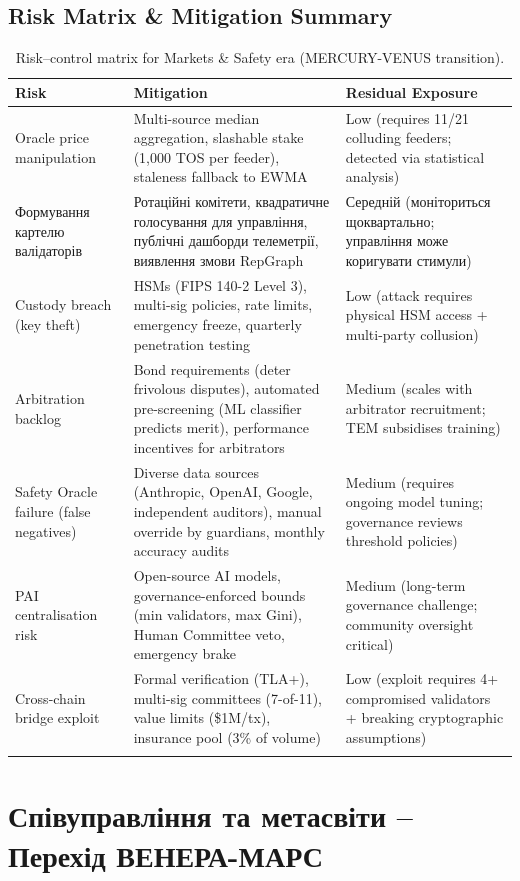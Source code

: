 \documentclass[11pt]{article}
\begin{document}
\subsection{Risk Matrix \& Mitigation Summary}
\begin{longtable}{@{}p{}p{}p{}@{}}
\toprule
\textbf{Risk} & \textbf{Mitigation} & \textbf{Residual Exposure} \\\midrule
Oracle price manipulation & Multi-source median aggregation, slashable stake (1,000 TOS per feeder), staleness fallback to EWMA & Low (requires 11/21 colluding feeders; detected via statistical analysis) \\
Формування картелю валідаторів & Ротаційні комітети, квадратичне голосування для управління, публічні дашборди телеметрії, виявлення змови RepGraph & Середній (моніториться щоквартально; управління може коригувати стимули) \\
Custody breach (key theft) & HSMs (FIPS 140-2 Level 3), multi-sig policies, rate limits, emergency freeze, quarterly penetration testing & Low (attack requires physical HSM access + multi-party collusion) \\
Arbitration backlog & Bond requirements (deter frivolous disputes), automated pre-screening (ML classifier predicts merit), performance incentives for arbitrators & Medium (scales with arbitrator recruitment; TEM subsidises training) \\
Safety Oracle failure (false negatives) & Diverse data sources (Anthropic, OpenAI, Google, independent auditors), manual override by guardians, monthly accuracy audits & Medium (requires ongoing model tuning; governance reviews threshold policies) \\
PAI centralisation risk & Open-source AI models, governance-enforced bounds (min validators, max Gini), Human Committee veto, emergency brake & Medium (long-term governance challenge; community oversight critical) \\
Cross-chain bridge exploit & Formal verification (TLA+), multi-sig committees (7-of-11), value limits (\$1M/tx), insurance pool (3\% of volume) & Low (exploit requires 4+ compromised validators + breaking cryptographic assumptions) \\\bottomrule
\caption{Risk--control matrix for Markets \& Safety era (MERCURY-VENUS transition).}
\label{tab:risk-markets-expanded}
\end{longtable}

\section{Співуправління та метасвіти -- Перехід ВЕНЕРА-МАРС}
\end{document}

